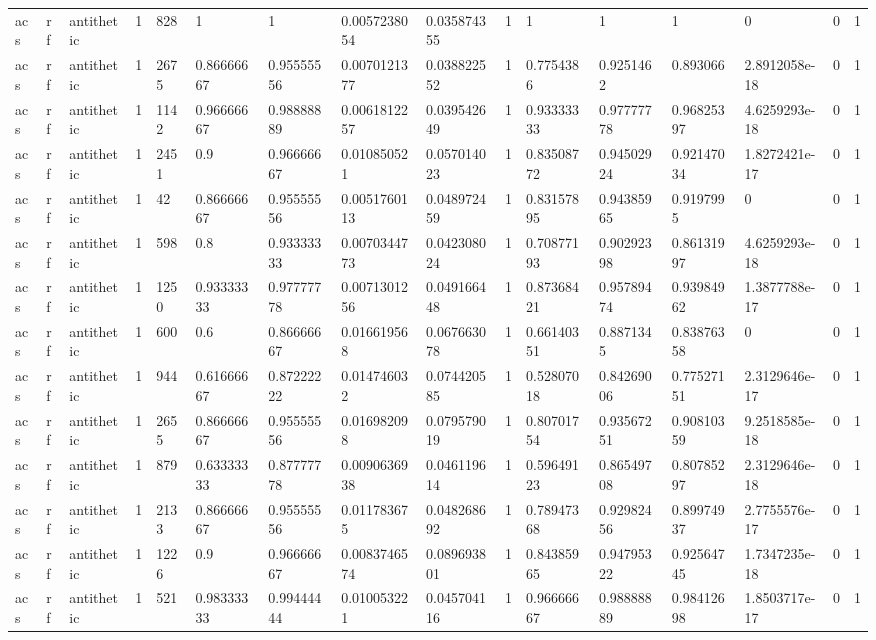 \begin{tabular}{llllllllllllllll}
acs & rf & antithetic & 1 & 828 & 1 & 1 & 0.0057238054 & 0.035874355 & 1 & 1 & 1 & 1 & 0 & 0 & 1 \\
acs & rf & antithetic & 1 & 2675 & 0.86666667 & 0.95555556 & 0.0070121377 & 0.038822552 & 1 & 0.7754386 & 0.9251462 & 0.893066 & 2.8912058e-18 & 0 & 1 \\
acs & rf & antithetic & 1 & 1142 & 0.96666667 & 0.98888889 & 0.0061812257 & 0.039542649 & 1 & 0.93333333 & 0.97777778 & 0.96825397 & 4.6259293e-18 & 0 & 1 \\
acs & rf & antithetic & 1 & 2451 & 0.9 & 0.96666667 & 0.010850521 & 0.057014023 & 1 & 0.83508772 & 0.94502924 & 0.92147034 & 1.8272421e-17 & 0 & 1 \\
acs & rf & antithetic & 1 & 42 & 0.86666667 & 0.95555556 & 0.0051760113 & 0.048972459 & 1 & 0.83157895 & 0.94385965 & 0.9197995 & 0 & 0 & 1 \\
acs & rf & antithetic & 1 & 598 & 0.8 & 0.93333333 & 0.0070344773 & 0.042308024 & 1 & 0.70877193 & 0.90292398 & 0.86131997 & 4.6259293e-18 & 0 & 1 \\
acs & rf & antithetic & 1 & 1250 & 0.93333333 & 0.97777778 & 0.0071301256 & 0.049166448 & 1 & 0.87368421 & 0.95789474 & 0.93984962 & 1.3877788e-17 & 0 & 1 \\
acs & rf & antithetic & 1 & 600 & 0.6 & 0.86666667 & 0.016619568 & 0.067663078 & 1 & 0.66140351 & 0.8871345 & 0.83876358 & 0 & 0 & 1 \\
acs & rf & antithetic & 1 & 944 & 0.61666667 & 0.87222222 & 0.014746032 & 0.074420585 & 1 & 0.52807018 & 0.84269006 & 0.77527151 & 2.3129646e-17 & 0 & 1 \\
acs & rf & antithetic & 1 & 2655 & 0.86666667 & 0.95555556 & 0.016982098 & 0.079579019 & 1 & 0.80701754 & 0.93567251 & 0.90810359 & 9.2518585e-18 & 0 & 1 \\
acs & rf & antithetic & 1 & 879 & 0.63333333 & 0.87777778 & 0.0090636938 & 0.046119614 & 1 & 0.59649123 & 0.86549708 & 0.80785297 & 2.3129646e-18 & 0 & 1 \\
acs & rf & antithetic & 1 & 2133 & 0.86666667 & 0.95555556 & 0.011783675 & 0.048268692 & 1 & 0.78947368 & 0.92982456 & 0.89974937 & 2.7755576e-17 & 0 & 1 \\
acs & rf & antithetic & 1 & 1226 & 0.9 & 0.96666667 & 0.0083746574 & 0.089693801 & 1 & 0.84385965 & 0.94795322 & 0.92564745 & 1.7347235e-18 & 0 & 1 \\
acs & rf & antithetic & 1 & 521 & 0.98333333 & 0.99444444 & 0.010053221 & 0.045704116 & 1 & 0.96666667 & 0.98888889 & 0.98412698 & 1.8503717e-17 & 0 & 1 \\

\end{tabular}
